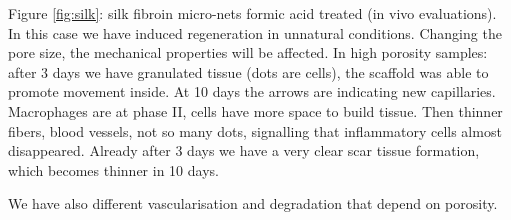 Figure \ref{fig:silk}: silk fibroin micro-nets formic acid treated (in vivo evaluations). 
In this case we have induced regeneration in unnatural conditions. 
Changing the pore size, the mechanical properties will be affected. In high porosity samples: after 3 days we have granulated tissue (dots are cells), the scaffold was able to promote movement inside. 
At 10 days the arrows are indicating new capillaries. 
Macrophages are at phase II, cells have more space to build tissue. 
Then thinner fibers, blood vessels, not so many dots, signalling that inflammatory cells almost disappeared. 
Already after 3 days we have a very clear scar tissue formation, which becomes thinner in 10 days. 

We have also different vascularisation and degradation that depend on porosity.
